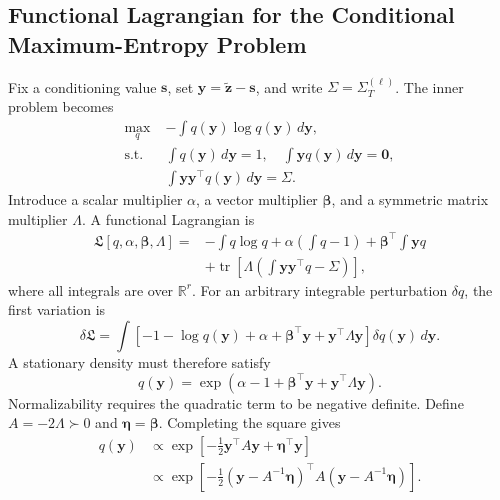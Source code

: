 \documentclass{article}
\newcommand{\R}{\mathbb{R}}
\newcommand{\bs}{\boldsymbol{s}}
\newcommand{\bz}{\boldsymbol{z}}
\newcommand{\by}{\boldsymbol{y}}
\newcommand{\bSigma}{\varSigma}
\theoremstyle{plain}
\theoremstyle{definition}
\theoremstyle{remark}
\begin{document}
\subsection{Functional Lagrangian for the Conditional Maximum-Entropy Problem}
\label{app:maxent-lagrangian}

Fix a conditioning value $\bs$, set
$\by=\widetilde{\bz}-\bs$, and write $\bSigma=\bSigma_T^{(\ell)}$.
The inner problem becomes
\begin{equation}
\begin{aligned}
  \max_q\;&-\int q(\by)\log q(\by)\,d\by,\\
  \text{s.t.}\;&\int q(\by)\,d\by=1,
  \quad \int \by q(\by)\,d\by=\boldsymbol 0,\\
  &\int \by\by^\top q(\by)\,d\by=\bSigma.
  \label{eq:app-centered-maxent}
\end{aligned}
\end{equation}
Introduce a scalar multiplier $\alpha$, a vector multiplier $\boldsymbol\beta$,
and a symmetric matrix multiplier $\Lambda$.  A functional Lagrangian is
\begin{equation}
\begin{aligned}
  \mathfrak L[q,\alpha,\boldsymbol\beta,\Lambda]
  =&-\int q\log q
  +\alpha\left(\int q-1\right)
  +\boldsymbol\beta^\top\int \by q\\
  &+\operatorname{tr}\!\left[
  \Lambda\left(\int \by\by^\top q-\bSigma\right)\right],
  \label{eq:app-functional-lagrangian}
\end{aligned}
\end{equation}
where all integrals are over $\R^r$.  For an arbitrary integrable perturbation
$\delta q$, the first variation is
\begin{equation}
  \delta\mathfrak L
  =\int\left[-1-\log q(\by)+\alpha
  +\boldsymbol\beta^\top\by+\by^\top\Lambda\by\right]
  \delta q(\by)\,d\by.
  \label{eq:app-first-variation}
\end{equation}
A stationary density must therefore satisfy
\begin{equation}
  q(\by)=\exp\!\left(\alpha-1+
  \boldsymbol\beta^\top\by+\by^\top\Lambda\by\right).
  \label{eq:app-stationary-exponential}
\end{equation}
Normalizability requires the quadratic term to be negative definite.  Define
$A=-2\Lambda\succ0$ and $\boldsymbol\eta=\boldsymbol\beta$.  Completing the
square gives
\begin{equation}
\begin{aligned}
  q(\by)&\propto
  \exp\!\left[-\frac12\by^\top A\by+
  \boldsymbol\eta^\top\by\right]\\
  &\propto
  \exp\!\left[-\frac12
  (\by-A^{-1}\boldsymbol\eta)^\top A
  (\by-A^{-1}\boldsymbol\eta)\right].
  \label{eq:app-complete-square}
\end{aligned}
\end{equation}
\end{document}
